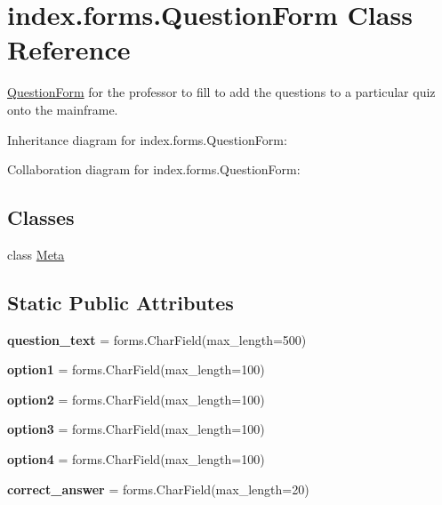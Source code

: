 \hypertarget{classindex_1_1forms_1_1QuestionForm}{}\section{index.\+forms.\+Question\+Form Class Reference}
\label{classindex_1_1forms_1_1QuestionForm}


\hyperlink{classindex_1_1forms_1_1QuestionForm}{Question\+Form} for the professor to fill to add the questions to a particular quiz onto the mainframe.  




Inheritance diagram for index.\+forms.\+Question\+Form\+:


Collaboration diagram for index.\+forms.\+Question\+Form\+:
\subsection*{Classes}
\begin{DoxyCompactItemize}
\item 
class \hyperlink{classindex_1_1forms_1_1QuestionForm_1_1Meta}{Meta}
\end{DoxyCompactItemize}
\subsection*{Static Public Attributes}
\begin{DoxyCompactItemize}
\item 
\mbox{\label{classindex_1_1forms_1_1QuestionForm_ae891d92b237fe4044a938996d093302f}} 
{\bfseries question\+\_\+text} = forms.\+Char\+Field(max\+\_\+length=500)
\item 
\mbox{\label{classindex_1_1forms_1_1QuestionForm_a683dbe63d4ad5bbc1dc033fc3bbb2810}} 
{\bfseries option1} = forms.\+Char\+Field(max\+\_\+length=100)
\item 
\mbox{\label{classindex_1_1forms_1_1QuestionForm_aba0eb4bb05b57184435c5eea990579d3}} 
{\bfseries option2} = forms.\+Char\+Field(max\+\_\+length=100)
\item 
\mbox{\label{classindex_1_1forms_1_1QuestionForm_a3e1b619e9c234ea31c608f67489cd77e}} 
{\bfseries option3} = forms.\+Char\+Field(max\+\_\+length=100)
\item 
\mbox{\label{classindex_1_1forms_1_1QuestionForm_adde07889c91123c17003ff8b186d979a}} 
{\bfseries option4} = forms.\+Char\+Field(max\+\_\+length=100)
\item 
\mbox{\label{classindex_1_1forms_1_1QuestionForm_a98ac172f6ac2ec078107e5aca6a7f393}} 
{\bfseries correct\+\_\+answer} = forms.\+Char\+Field(max\+\_\+length=20)
\end{DoxyCompactItemize}


